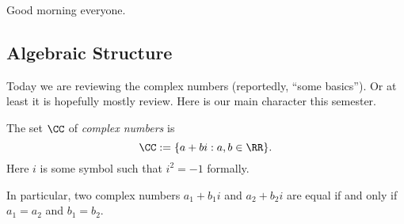 
Good morning everyone.

\subsection{Algebraic Structure}
Today we are reviewing the complex numbers (reportedly, ``some basics''). Or at least it is hopefully mostly review. Here is our main character this semester.
\begin{definition}
	The set $\CC$ of \textit{complex numbers} is
	\[\CC:=\{a+bi:a,b\in\RR\}.\]
	Here $i$ is some symbol such that $i^2=-1$ formally.
\end{definition}
In particular, two complex numbers $a_1+b_1i$ and $a_2+b_2i$ are equal if and only if $a_1=a_2$ and $b_1=b_2$.

